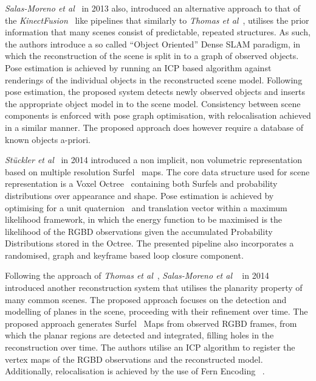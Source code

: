 \textit{Salas-Moreno et al}~\cite{Salas-Moreno2013} in 2013 also, introduced an alternative 
approach to that of the \textit{KinectFusion}~\cite{Newcombe2011} like pipelines that similarly to 
\textit{Thomas et al}~\cite{Thomas2013}, utilises the prior information that many scenes consist 
of predictable, repeated structures. As such, the authors introduce a so called ``Object Oriented'' 
Dense SLAM paradigm, in which the reconstruction of the scene is split in to a graph of observed 
objects. Pose estimation is achieved by running an ICP based algorithm against renderings of the 
individual objects in the reconstructed scene model. Following pose estimation, the proposed 
system detects newly observed objects and inserts the appropriate object model in to the scene 
model. Consistency between scene components is enforced with pose graph optimisation, with 
relocalisation achieved in a similar manner. The proposed approach does however require a 
database of known objects a-priori.

\textit{St{\"u}ckler et al}~\cite{Stuckler2014} in 2014 introduced a non implicit, non volumetric 
representation based on multiple resolution Surfel~\cite{Pfister2000} maps. The core data structure 
used for scene representation is a Voxel Octree~\cite{Laine2010} containing both Surfels and 
probability distributions over appearance and shape. Pose estimation is achieved by optimising for 
a unit quaternion~\cite{Mukundan2002} and translation vector within a maximum likelihood framework, 
in which the energy function to be maximised is the likelihood of the RGBD observations given the 
accumulated Probability Distributions stored in the Octree. The presented pipeline also incorporates 
a randomised, graph and keyframe based loop closure component.

Following the approach of \textit{Thomas et al}~\cite{Thomas2013}, \textit{Salas-Moreno et al} 
~\cite{Salas-Moreno2014} in 2014 introduced another reconstruction system that utilises the
planarity property of many common scenes. The proposed approach focuses on the detection and 
modelling of planes in the scene, proceeding with their refinement over time. 
The proposed approach generates Surfel~\cite{Pfister2000} Maps from observed RGBD frames, from 
which the planar regions are detected and integrated, filling holes in the reconstruction over time.
The authors utilise an ICP algorithm to register the vertex maps of the RGBD observations and the 
reconstructed model. Additionally, relocalisation is achieved by the use of Fern Encoding 
~\cite{Glocker2014}. 

